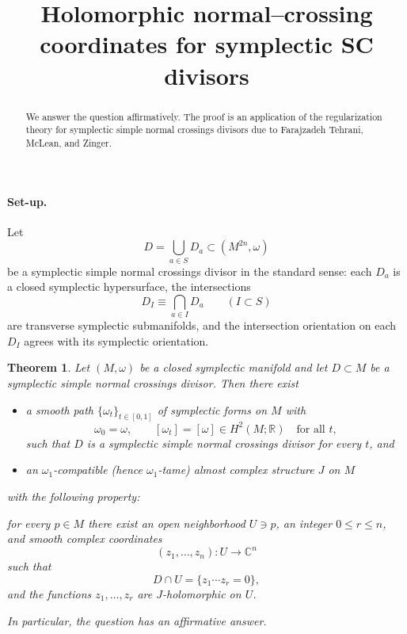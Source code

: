 \documentclass[11pt]{article}
\newtheorem{theorem}{Theorem}
\begin{document}
\title{Holomorphic normal--crossing coordinates for symplectic SC divisors}
\author{}
\date{}
\maketitle

\begin{abstract}
We answer the question affirmatively. The proof is an application of the
regularization theory for symplectic simple normal crossings divisors due to
Farajzadeh Tehrani, McLean, and Zinger.
\end{abstract}

\paragraph{Set-up.}
Let
\[
D=\bigcup_{a\in S}D_a\subset (M^{2n},\omega)
\]
be a symplectic simple normal crossings divisor in the standard sense: each
$D_a$ is a closed symplectic hypersurface, the intersections
\[
D_I\equiv \bigcap_{a\in I}D_a \qquad (I\subset S)
\]
are transverse symplectic submanifolds, and the intersection orientation on
each $D_I$ agrees with its symplectic orientation.

\begin{theorem}\label{thm:main}
Let $(M,\omega)$ be a closed symplectic manifold and let
$D\subset M$ be a symplectic simple normal crossings divisor.
Then there exist
\begin{itemize}[itemsep=0.2em]
\item a smooth path $\{\omega_t\}_{t\in[0,1]}$ of symplectic forms on $M$ with
\[
\omega_0=\omega,\qquad [\omega_t]=[\omega]\in H^2(M;\mathbb R)
\quad\text{for all }t,
\]
such that $D$ is a symplectic simple normal crossings divisor for every $t$,
and
\item an $\omega_1$-compatible (hence $\omega_1$-tame) almost complex structure
$J$ on $M$
\end{itemize}
with the following property:

for every $p\in M$ there exist an open neighborhood $U\ni p$, an integer
$0\le r\le n$, and smooth complex coordinates
\[
(z_1,\dots,z_n)\colon U\longrightarrow \mathbb C^n
\]
such that
\[
D\cap U=\{z_1\cdots z_r=0\},
\]
and the functions $z_1,\dots,z_r$ are $J$-holomorphic on $U$.

In particular, the question has an affirmative answer.
\end{theorem}
\end{document}
